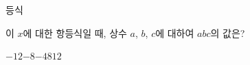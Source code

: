 등식 \par\smallskip{}\par\smallskip\noindent 이 $x$에 대한 항등식일 때, 상수 $a$, $b$, $c$에 대하여 $abc$의 값은?
\begin{choices32}{$-12$}{$-8$}{$-4$}{$8$}{$12$}\end{choices32}
